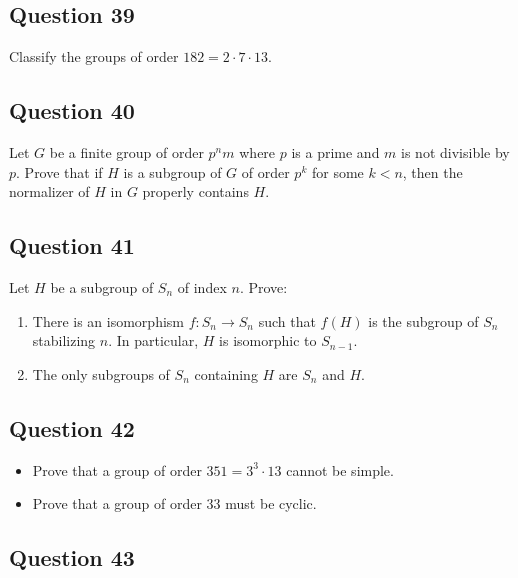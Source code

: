 \documentclass[12pt]{article}
\begin{document}
\hypertarget{question-39}{%
\subsection{Question 39}\label{question-39}}

Classify the groups of order \(182 = 2 \cdot 7 \cdot 13\).

\hypertarget{question-40}{%
\subsection{Question 40}\label{question-40}}

Let \(G\) be a finite group of order \(p^nm\) where \(p\) is a prime and
\(m\) is not divisible by \(p\). Prove that if \(H\) is a subgroup of
\(G\) of order \(p^k\) for some \(k<n\), then the normalizer of \(H\) in
\(G\) properly contains \(H\).

\hypertarget{question-41}{%
\subsection{Question 41}\label{question-41}}

Let \(H\) be a subgroup of \(S_n\) of index \(n\). Prove:

\begin{enumerate}
\def\labelenumi{\arabic{enumi}.}
\item
  There is an isomorphism \(f: S_n \to S_n\) such that \(f(H)\) is the
  subgroup of \(S_n\) stabilizing \(n\). In particular, \(H\) is
  isomorphic to \(S_{n-1}\).
\item
  The only subgroups of \(S_n\) containing \(H\) are \(S_n\) and \(H\).
\end{enumerate}

\hypertarget{question-42}{%
\subsection{Question 42}\label{question-42}}

\begin{itemize}
\item
  Prove that a group of order \(351=3^3\cdot 13\) cannot be simple.
\item
  Prove that a group of order \(33\) must be cyclic.
\end{itemize}

\hypertarget{question-43}{%
\subsection{Question 43}\label{question-43}}
\end{document}
